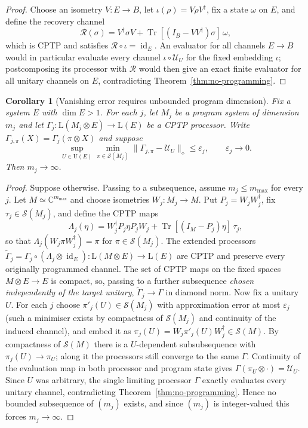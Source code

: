 \documentclass[11pt,a4paper]{article}
\newtheorem{corollary}[theorem]{Corollary}
\newcommand{\Lin}{\mathrm{L}}
\newcommand{\Sstate}{\mathcal{S}}
\newcommand{\Tr}{\operatorname{Tr}}
\newcommand{\id}{\operatorname{id}}
\begin{document}
\begin{proof}
Choose an isometry $V:E\to B$, let $\iota(\rho)=V\rho V^\dagger$, fix a state $\omega$ on $E$, and define the recovery channel
\[
\mathcal R(\sigma)=V^\dagger\sigma V+\Tr[(I_B-VV^\dagger)\sigma]\,\omega,
\]
which is CPTP and satisfies $\mathcal R\circ\iota=\id_E$. An evaluator for all channels $E\to B$ would in particular evaluate every channel $\iota\circ\mathcal U_U$ for the fixed embedding $\iota$; postcomposing its processor with $\mathcal R$ would then give an exact finite evaluator for all unitary channels on $E$, contradicting Theorem~\ref{thm:no-programming}.
\end{proof}

\begin{corollary}[Vanishing error requires unbounded program dimension]
\label{cor:divergence}
Fix a system $E$ with $\dim E>1$. For each $j$, let $M_j$ be a program system of dimension $m_j$ and let $\Gamma_j:\Lin(M_j\otimes E)\to\Lin(E)$ be a CPTP processor. Write $\Gamma_{j,\pi}(X)=\Gamma_j(\pi\otimes X)$ and suppose
\[
\sup_{U\in\mathrm U(E)}\min_{\pi\in\Sstate(M_j)}
\|\Gamma_{j,\pi}-\mathcal U_U\|_\diamond
\le\varepsilon_j,\qquad\varepsilon_j\longrightarrow0.
\]
Then $m_j\to\infty$.
\end{corollary}

\begin{proof}
Suppose otherwise. Passing to a subsequence, assume $m_j\le m_{\max}$ for every $j$. Let $M\simeq\mathbb C^{m_{\max}}$ and choose isometries $W_j:M_j\to M$. Put $P_j=W_jW_j^\dagger$, fix $\tau_j\in\Sstate(M_j)$, and define the CPTP maps
\[
\Lambda_j(\eta)=W_j^\dagger P_j\eta P_jW_j+\Tr[(I_M-P_j)\eta]\,\tau_j,
\]
so that $\Lambda_j(W_j\pi W_j^\dagger)=\pi$ for $\pi\in\Sstate(M_j)$. The extended processors $\widetilde\Gamma_j=\Gamma_j\circ(\Lambda_j\otimes\id_E):\Lin(M\otimes E)\to\Lin(E)$ are CPTP and preserve every originally programmed channel. The set of CPTP maps on the fixed spaces $M\otimes E\to E$ is compact, so, passing to a further subsequence \emph{chosen independently of the target unitary}, $\widetilde\Gamma_j\to\Gamma$ in diamond norm. Now fix a unitary $U$. For each $j$ choose $\pi'_j(U)\in\Sstate(M_j)$ with approximation error at most $\varepsilon_j$ (such a minimiser exists by compactness of $\Sstate(M_j)$ and continuity of the induced channel), and embed it as $\pi_j(U)=W_j\pi'_j(U)W_j^\dagger\in\Sstate(M)$. By compactness of $\Sstate(M)$ there is a $U$-dependent subsubsequence with $\pi_j(U)\to\pi_U$; along it the processors still converge to the same $\Gamma$. Continuity of the evaluation map in both processor and program state gives $\Gamma(\pi_U\otimes\cdot)=\mathcal U_U$. Since $U$ was arbitrary, the single limiting processor $\Gamma$ exactly evaluates every unitary channel, contradicting Theorem~\ref{thm:no-programming}. Hence no bounded subsequence of $(m_j)$ exists, and since $(m_j)$ is integer-valued this forces $m_j\to\infty$.
\end{proof}
\end{document}
